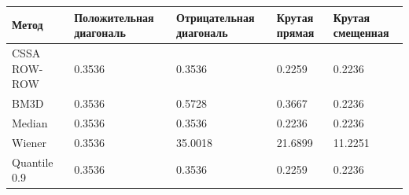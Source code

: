 \begin{tabular}{|l|l|l|l|l|}
\hline
Метод & Положительная диагональ & Отрицательная диагональ & Крутая прямая & Крутая смещенная \\
\hline
CSSA ROW-ROW & 0.3536 & 0.3536 & 0.2259 & 0.2236 \\
\hline
BM3D & 0.3536 & 0.5728 & 0.3667 & 0.2236 \\
\hline
Median & 0.3536 & 0.3536 & 0.2236 & 0.2236 \\
\hline
Wiener & 0.3536 & 35.0018 & 21.6899 & 11.2251 \\
\hline
Quantile 0.9 & 0.3536 & 0.3536 & 0.2259 & 0.2236 \\
\hline
\end{tabular}
